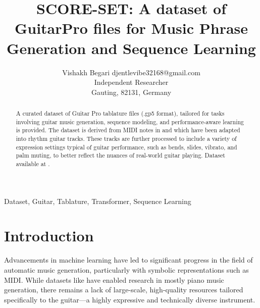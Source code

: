 \documentclass[twoside,11pt]{article}
\begin{document}
\title{SCORE-SET: A dataset of GuitarPro files for Music Phrase Generation and Sequence Learning}

\author{\name Vishakh Begari \email djentlevibe32168@gmail.com \\
       \addr Independent Researcher\\
       Gauting, 82131, Germany}


\maketitle

\begin{abstract}%
A curated dataset of Guitar Pro tablature files (.gp5 format), 
tailored for tasks involving guitar music generation, sequence modeling, and 
performance-aware learning is provided. 
The dataset is derived from MIDI notes in \cite{hawthorne2018enabling} and 
\cite{kong2022giantmidipianolargescalemididataset} which have been 
adapted into rhythm guitar tracks. These tracks are 
further processed to include a variety of expression settings typical 
of guitar performance, such as bends, slides, vibrato, and palm muting, 
to better reflect the nuances of real-world guitar playing. Dataset available at 
\cite{SCORESET}.
\end{abstract}

\begin{keywords}
  Dataset, Guitar, Tablature, Transformer, Sequence Learning
\end{keywords}

\section{Introduction}
Advancements in machine learning have led to significant progress in the 
field of automatic music generation, particularly with symbolic representations 
such as MIDI. While datasets like 
\cite{hawthorne2018enabling} 
\cite{7952261} 
\cite{thickstun2017learningfeaturesmusicscratch} 
\cite{bertinmahieux-2011-million} 
\cite{peracha2022jsfakechoralessynthetic}
\cite{bradshaw2025ariamididatasetpianomidi}
\cite{kong2022giantmidipianolargescalemididataset}
have enabled research in mostly piano music generation, there remains a lack of 
large-scale, high-quality resources tailored specifically to the guitar—a highly 
expressive and technically diverse instrument.
\end{document}
